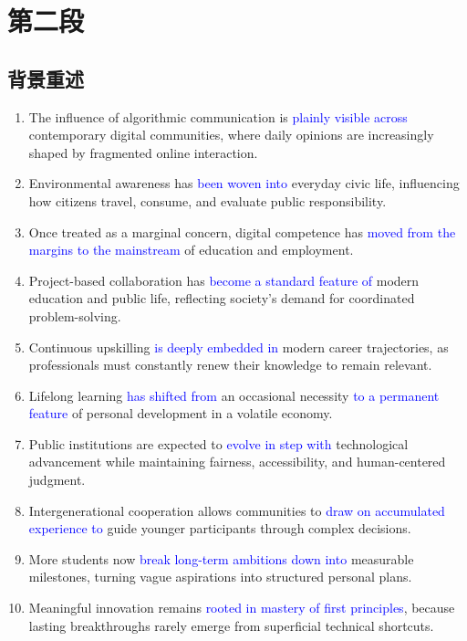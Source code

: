 \section{第二段}

\subsection{背景重述}

\begin{enumerate}
\item The influence of algorithmic communication is \textcolor{blue}{plainly visible across} contemporary digital communities, where daily opinions are increasingly shaped by fragmented online interaction.
\item Environmental awareness has \textcolor{blue}{been woven into} everyday civic life, influencing how citizens travel, consume, and evaluate public responsibility.
\item Once treated as a marginal concern, digital competence has \textcolor{blue}{moved from the margins to the mainstream} of education and employment.
\item Project-based collaboration has \textcolor{blue}{become a standard feature of} modern education and public life, reflecting society's demand for coordinated problem-solving.
\item Continuous upskilling \textcolor{blue}{is deeply embedded in} modern career trajectories, as professionals must constantly renew their knowledge to remain relevant.
\item Lifelong learning \textcolor{blue}{has shifted from} an occasional necessity \textcolor{blue}{to a permanent feature} of personal development in a volatile economy.
\item Public institutions are expected to \textcolor{blue}{evolve in step with} technological advancement while maintaining fairness, accessibility, and human-centered judgment.
\item Intergenerational cooperation allows communities to \textcolor{blue}{draw on accumulated experience to} guide younger participants through complex decisions.
\item More students now \textcolor{blue}{break long-term ambitions down into} measurable milestones, turning vague aspirations into structured personal plans.
\item Meaningful innovation remains \textcolor{blue}{rooted in mastery of first principles}, because lasting breakthroughs rarely emerge from superficial technical shortcuts.

\end{enumerate}
